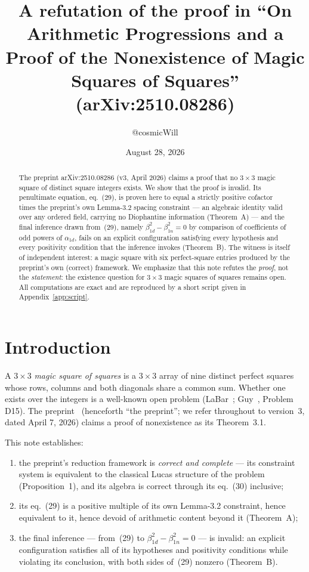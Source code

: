 \documentclass[11pt]{amsart}
\title[Refutation of the proof in arXiv:2510.08286]{A refutation of the
proof in ``On Arithmetic Progressions and a Proof of the Nonexistence of
Magic Squares of Squares'' (arXiv:2510.08286)}
\author{@cosmicWill}
\date{August 28, 2026}
\theoremstyle{remark}
\begin{document}
\begin{abstract}
The preprint arXiv:2510.08286 (v3, April 2026) claims a proof that no
$3\times 3$ magic square of distinct square integers exists. We show that
the proof is invalid. Its penultimate equation, eq.~(29), is proven here
to equal a strictly positive cofactor times the preprint's own Lemma-3.2
spacing constraint --- an algebraic identity valid over any ordered
field, carrying no Diophantine information (Theorem~A) --- and the final
inference drawn from~(29), namely $\beta_{1d}^2 - \beta_{1n}^2 = 0$ by
comparison of coefficients of odd powers of $\alpha_{1d}$, fails on an
explicit configuration satisfying every hypothesis and every positivity
condition that the inference invokes (Theorem~B). The witness is itself
of independent interest: a magic square with six perfect-square entries
produced by the preprint's own (correct) framework. We emphasize that
this note refutes the \emph{proof}, not the \emph{statement}: the
existence question for $3\times 3$ magic squares of squares remains
open. All computations are exact and are reproduced by a short script
given in Appendix~\ref{app:script}.
\end{abstract}

\maketitle

\section{Introduction}

A $3\times 3$ \emph{magic square of squares} is a $3\times 3$ array of
nine distinct perfect squares whose rows, columns and both diagonals
share a common sum. Whether one exists over the integers is a
well-known open problem (LaBar~\cite{LaBar}; Guy~\cite{Guy}, Problem
D15). The preprint~\cite{Hill} (henceforth ``the preprint''; we refer
throughout to version~3, dated April 7, 2026) claims a proof of
nonexistence as its Theorem~3.1.

This note establishes:

\begin{enumerate}
\item[(a)] the preprint's reduction framework is \emph{correct and
  complete} --- its constraint system is equivalent to the classical
  Lucas structure of the problem (Proposition~1), and its algebra is
  correct through its eq.~(30) inclusive;
\item[(b)] its eq.~(29) is a positive multiple of its own Lemma-3.2
  constraint, hence equivalent to it, hence devoid of arithmetic
  content beyond it (Theorem~A);
\item[(c)] the final inference --- from~(29) to $\beta_{1d}^2 -
  \beta_{1n}^2 = 0$ --- is invalid: an explicit configuration satisfies
  all of its hypotheses and positivity conditions while violating its
  conclusion, with both sides of~(29) nonzero (Theorem~B).
\end{enumerate}
\end{document}
